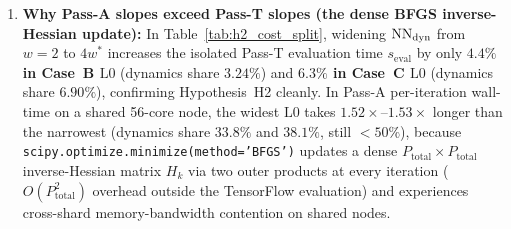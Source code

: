 \begin{enumerate}[leftmargin=2em]
  \item \textbf{Why Pass-A slopes exceed Pass-T slopes (the dense BFGS inverse-Hessian update):} In Table~\ref{tab:h2_cost_split}, widening $\mathrm{NN}_{\mathrm{dyn}}$ from $w=2$ to $4w^*$ increases the isolated Pass-T evaluation time $s_{\mathrm{eval}}$ by only \textbf{$4.4\%$ in Case~B $\mathrm{L0}$} (dynamics share $3.24\%$) and \textbf{$6.3\%$ in Case~C $\mathrm{L0}$} (dynamics share $6.90\%$), confirming Hypothesis~H2 cleanly. In Pass-A per-iteration wall-time on a shared 56-core node, the widest $\mathrm{L0}$ takes $1.52\times$--$1.53\times$ longer than the narrowest (dynamics share $33.8\%$ and $38.1\%$, still $< 50\%$), because \texttt{scipy.optimize.minimize(method='BFGS')} updates a dense $P_{\mathrm{total}} \times P_{\mathrm{total}}$ inverse-Hessian matrix $H_k$ via two outer products at every iteration ($O(P_{\mathrm{total}}^2)$ overhead outside the TensorFlow evaluation) and experiences cross-shard memory-bandwidth contention on shared nodes.
\end{enumerate}
